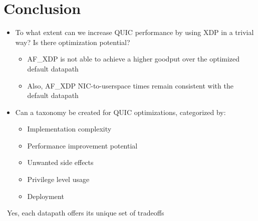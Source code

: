 
\section{Conclusion}
\begin{frame}
    \begin{itemize}
        \item To what extent can we increase QUIC performance by using XDP in a trivial way? Is there optimization potential?
        \begin{itemize}
            \item AF\_XDP is not able to achieve a higher goodput over the optimized default datapath
            \item Also, AF\_XDP NIC-to-userspace times remain consistent with the default datapath
        \end{itemize}
    \end{itemize}
    \begin{itemize}
        \item Can a taxonomy be created for QUIC optimizations, categorized by:
        \begin{itemize}
            \item Implementation complexity
            \item Performance improvement potential
            \item Unwanted side effects
            \item Privilege level usage
            \item Deployment
        \end{itemize}
    \end{itemize}
    \begin{center}
        \yes\ Yes, each datapath offers its unique set of tradeoffs
    \end{center}
\end{frame}

